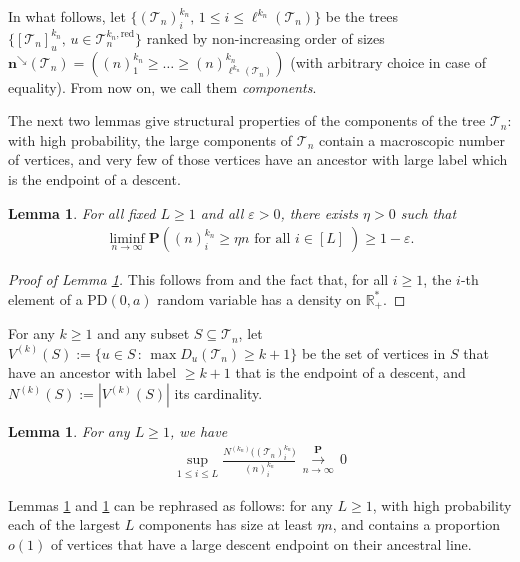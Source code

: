 \documentclass{article}
\newtheorem{lemma}[theorem]{Lemma}
\theoremstyle{remark}
\newcommand{\bR}{\mathbb{R}}
\newcommand{\cv}[1]{\,\underset{#1}{\longrightarrow}\,}
\newcommand{\cT}{\mathcal{T}}
\newcommand{\bn}{\mathbf{n}}
\newcommand{\bP}{\mathbf{P}}
\newcommand{\prob}[1]{\mathbf{P}{\left(#1\right)}}
\newcommand{\PoissonDirichlet}[2]{\mathrm{PD}{\left(#1,#2\right)}}
\newcommand{\red}{\mathrm{red}}
\begin{document}
In what follows, let $\{ (\cT_n)_i^{k_n} ,\, 1\le i\le \ell^{k_n}(\cT_n) \}$ be the trees $\{ [\cT_n]_u^{k_n} ,\, u \in \cT_n^{k_n,\red}\}$ ranked by non-increasing order of sizes $\bn^\searrow(\cT_n) = \left( (n)_1^{k_n} \ge \ldots \ge (n)_{\ell^{k_n}(\cT_n)}^{k_n} \right)$ (with arbitrary choice in case of equality). 
From now on, we call them \textit{components}. 

The next two lemmas give structural properties of the components of the tree $\cT_n$: 
with high probability, the large components of $\cT_n$ contain a macroscopic number of vertices, and very few of those vertices have an ancestor with large label which is the endpoint of a descent.

\begin{lemma}
\label{lem:lemmerelou4bis}
For all fixed $L \geq 1$ and all $\varepsilon>0$, there exists $\eta>0$ such that
\begin{align*}
    \liminf_{n\to\infty} \prob{ (n)_i^{k_n} \geq \eta n \text{ for all } i\in[L]\;} \geq 1-\varepsilon.
\end{align*}
\end{lemma}

\begin{proof}[Proof of Lemma \ref{lem:lemmerelou4bis}]
    This follows from  and the fact that, for all $i \geq 1$, the $i$-th element of a $\PoissonDirichlet{0}{a}$ random variable has a density on $\bR_+^*$. 
\end{proof}

For any $k \geq 1$ and any subset $S \subseteq \cT_n$, let $V^{(k)}(S) := \{ u \in S \,:\, \max D_u(\cT_n) \geq k+1\}$ be the set of vertices in $S$ that have an ancestor with label $\geq k+1$ that is the endpoint of a descent, and $N^{(k)}(S) := |V^{(k)}(S)|$ its cardinality.

\begin{lemma}
\label{lem:lemmerelou5bis}
For any $L \geq 1$, we have
\begin{align*}
    \sup\limits_{1 \leq i \leq L} \frac{N^{(k_n)}\big( (\cT_n)_i^{k_n} \big)}{(n)_i^{k_n}} \overset{\bP}{\cv{n\to\infty}} 0
\end{align*}
\end{lemma}

Lemmas \ref{lem:lemmerelou4bis} and \ref{lem:lemmerelou5bis} can be rephrased as follows: for any $L \geq 1$, with high probability each of the largest $L$ components has size at least $\eta n$, and contains a proportion $o(1)$ of vertices that have a large descent endpoint on their ancestral line.
\end{document}
